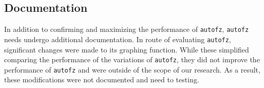\subsection{Documentation} In addition to confirming and maximizing the performance of \texttt{autofz},
\texttt{autofz} needs undergo additional documentation. In route of evaluating \texttt{autofz}, significant 
changes were made to its graphing function. While these simplified comparing the performance of the variations
of \texttt{autofz}, they did not improve the performance of \texttt{autofz} and were outside of the scope of our research.
As a result, these modifications were not documented and need to testing. 



